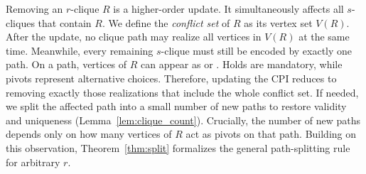 Removing an $r$-clique $R$ is a higher-order update.
It simultaneously affects all $s$-cliques that contain $R$.
% 
We define the \emph{conflict set} of $R$ as its vertex set $V(R)$.
After the update, no clique path may realize all vertices in $V(R)$ at the same time.
Meanwhile, every remaining $s$-clique must still be encoded by exactly one path.
% 
On a path, vertices of $R$ can appear as \hold or \pivot.
Holds are mandatory, while pivots represent alternative choices.
Therefore, updating the CPI reduces to removing exactly those realizations that include the whole conflict set.
If needed, we split the affected path into a small number of new paths to restore validity and uniqueness (Lemma~\ref{lem:clique_count}).
Crucially, the number of new paths depends only on how many vertices of $R$ act as pivots on that path.
Building on this observation, Theorem~\ref{thm:split} formalizes the general path-splitting rule for arbitrary $r$.



